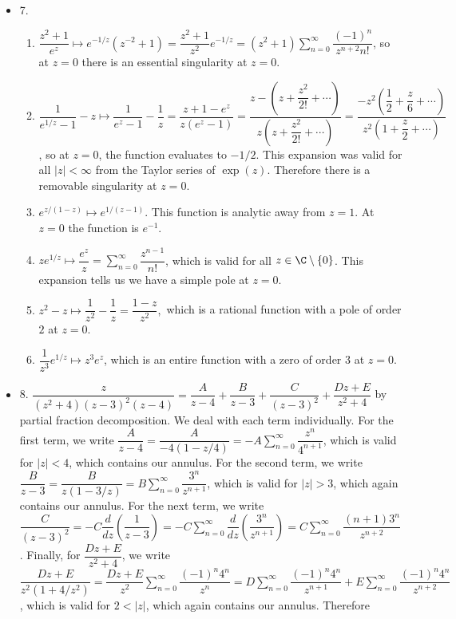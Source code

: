 \documentclass[11pt]{book}
\theoremstyle{definition}
\begin{document}
\begin{itemize}
\item 7.
\begin{enumerate}
\item $\dfrac{z^2+1}{e^z}\mapsto e^{-1/z}(z^{-2}+1)=\dfrac{z^2+1}{z^2}e^{-1/z}=(z^2+1)\sum_{n=0}^\infty \dfrac{(-1)^n}{z^{n+2}n!}$, so at $z=0$ there is an essential singularity at $z=0$.
\item $\dfrac{1}{e^{1/z}-1}-z\mapsto \dfrac{1}{e^z-1}-\dfrac{1}{z}=\dfrac{z+1-e^z}{z(e^z-1)}=\dfrac{z-(z+\dfrac{z^2}{2!}+\cdots)}{z(z+\dfrac{z^2}{2!}+\cdots)}=\dfrac{-z^2(\dfrac{1}{2}+\dfrac{z}{6}+\cdots)}{z^2(1+\dfrac{z}{2}+\cdots)}$, so at $z=0$, the function evaluates to $-1/2$. This expansion was  valid for all $|z|<\infty$ from the Taylor series of $\exp(z)$. Therefore there is a removable singularity at $z=0$.  
\item $e^{z/(1-z)}\mapsto e^{1/(z-1)}$. This function is analytic away from $z=1$. At $z=0$ the function is $e^{-1}$.
\item $ze^{1/z}\mapsto \dfrac{e^z}{z}=\sum_{n=0}^\infty \dfrac{z^{n-1}}{n!}$, which is valid for all $z\in\C\setminus{\{0\}}$. This expansion tells us we have a simple pole at $z=0$.
\item $z^2-z\mapsto \dfrac{1}{z^2}-\dfrac{1}{z}=\dfrac{1-z}{z^2},$ which is a rational function with a pole of order $2$ at $z=0$.
\item $\dfrac{1}{z^3}e^{1/z}\mapsto z^3e^z$, which is an entire function with a zero of order 3 at $z=0$.
\end{enumerate}
\item 8. $\dfrac{z}{(z^2+4)(z-3)^2(z-4)} = \dfrac{A}{z-4}+\dfrac{B}{z-3}+\dfrac{C}{(z-3)^2}+\dfrac{Dz+E}{z^2+4}$ by partial fraction decomposition. We deal with each term individually. For the first term, we write $\dfrac{A}{z-4}=\dfrac{A}{-4(1-z/4)}=-A\sum_{n=0}^\infty \dfrac{z^n}{4^{n+1}}$, which is valid for $|z|<4$, which contains our annulus. For the second term, we write $\dfrac{B}{z-3}=\dfrac{B}{z(1-3/z)}=B\sum_{n=0}^\infty \dfrac{3^n}{z^{n+1}}$, which is valid for $|z|>3$, which again contains our annulus. For the next term, we write $\dfrac{C}{(z-3)^2}=-C\dfrac{d}{dz}\left(\dfrac{1}{z-3}\right)=-C\sum_{n=0}^\infty \dfrac{d}{dz}\left(\dfrac{3^n}{z^{n+1}}\right)=C\sum_{n=0}^\infty\dfrac{(n+1)3^n}{z^{n+2}}$. Finally, for $\dfrac{Dz+E}{z^2+4}$, we write $\dfrac{Dz+E}{z^2(1+4/z^2)}=\dfrac{Dz+E}{z^2}\sum_{n=0}^\infty \dfrac{(-1)^n4^n}{z^n}=D\sum_{n=0}^\infty \dfrac{(-1)^n4^n}{z^{n+1}}+E\sum_{n=0}^\infty \dfrac{(-1)^n4^n}{z^{n+2}}$, which is valid for $2<|z|$, which again contains our annulus. Therefore

\end{itemize}
\end{document}
